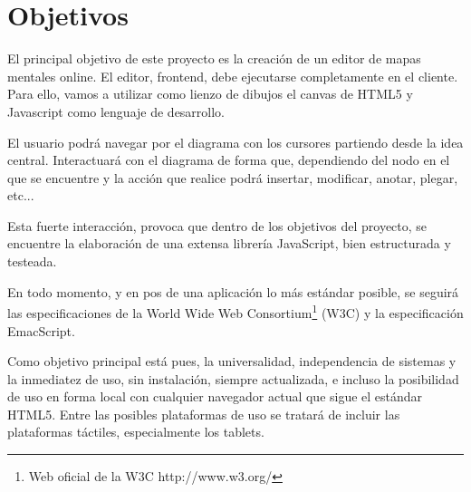 \section{Objetivos}

El principal objetivo de este proyecto es la creación de un editor de mapas mentales online. El editor, frontend, debe ejecutarse completamente en el cliente. Para ello, vamos a utilizar como lienzo de dibujos el canvas de HTML5 y Javascript como lenguaje de desarrollo. 

El usuario podrá navegar por el diagrama con los cursores partiendo desde la idea central. Interactuará con el diagrama de forma que, dependiendo del nodo en el que se encuentre y la acción que realice podrá insertar, modificar, anotar, plegar, etc...

Esta fuerte interacción, provoca que dentro de los objetivos del proyecto, se encuentre la elaboración de una  extensa librería JavaScript, bien estructurada y testeada. 

En todo momento, y en pos de una aplicación lo más estándar posible, se seguirá las especificaciones de la World Wide Web Consortium\footnote{Web oficial de la W3C http://www.w3.org/} (W3C) y la especificación EmacScript.

Como objetivo principal está pues, la universalidad, independencia de sistemas y la inmediatez de uso, sin instalación, siempre actualizada, e incluso la posibilidad de uso en forma local con cualquier navegador actual que sigue el estándar HTML5.  Entre las posibles plataformas de uso se tratará de incluir las plataformas táctiles, especialmente los tablets.
